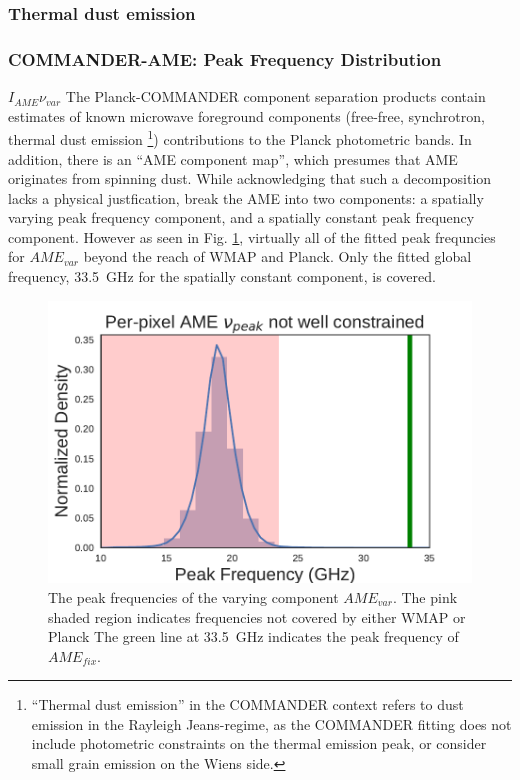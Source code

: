       \subsubsection{Thermal dust emission}

       \subsubsection{COMMANDER-AME: Peak Frequency Distribution}

        $I_{AME}\nu_{var}$
        The Planck-COMMANDER component separation products contain estimates of known microwave foreground components (free-free, synchrotron, thermal dust emission \footnote{``Thermal dust emission'' in the COMMANDER context refers to dust emission in the Rayleigh Jeans-regime, as the COMMANDER fitting does not include photometric constraints on the thermal emission peak, or consider small grain emission on the Wiens side.}) contributions to the Planck photometric bands. In addition, there is an ``AME component map'', which presumes that AME originates from spinning dust. While acknowledging that such a decomposition lacks a physical justfication, \cite{planck15X} break the AME into two components: a spatially varying peak frequency component, and a spatially constant peak frequency component. However as seen in Fig. \ref{fig:AME_commander_freqdist}, virtually all of the fitted peak frequncies for $AME_{var}$ beyond the reach of WMAP and Planck. Only the fitted global frequency, 33.5~GHz for the spatially constant component, is covered.


        \begin{figure}
          \label{fig:AME_commander_freqdist}
          \includegraphics[width=185mm]{../Plots/ch_intro/AME_commander_freqdist.pdf}
          \centering
          \caption{The peak frequencies of the varying component $AME_{var}$.  The pink shaded region indicates frequencies not covered by either WMAP or Planck The green line at 33.5~GHz indicates the peak frequency of $AME_{fix}$.}
        \end{figure}

